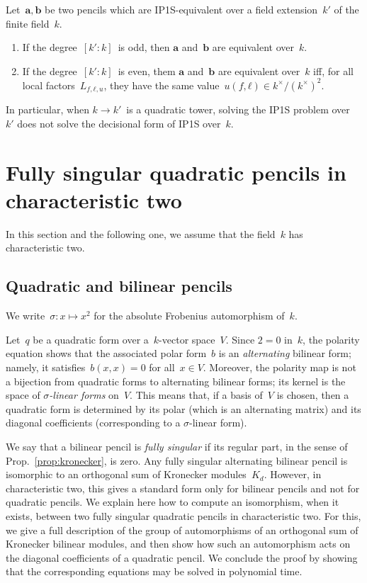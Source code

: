 \documentclass{article}%
\begin{document}
\begin{prop}\label{prop:IP1S-extension}
Let~$\bm{a}, \bm{b}$ be two pencils which are IP1S-equivalent over a
field extension~$k'$ of the finite field~$k$.
\begin{enumerate}
\item If the degree~$[k':k]$~is odd, then $\bm{a}$ and~$\bm{b}$ are
equivalent over~$k$.
\item If the degree~$[k':k]$~is even, them $\bm{a}$ and~$\bm{b}$ are
equivalent over~$k$ iff, for all local factors~$L_{f,ℓ,u}$, they have the
same value~$u(f,ℓ) ∈ k^{×}/(k^{×})^2$.
\end{enumerate}
\end{prop}

In particular, when $k → k'$~is a quadratic tower, solving the IP1S
problem over~$k'$ does not solve the decisional form of IP1S over~$k$.

\section{Fully singular quadratic pencils in characteristic two}%
\label{S:quad-sing}
In this section and the following one, we assume that the field~$k$ has
characteristic two.

\subsection{Quadratic and bilinear pencils}%

We write~$σ: x ↦ x^2$ for the absolute Frobenius automorphism of~$k$.

Let~$q$ be a quadratic form over a~$k$-vector space~$V$. Since $2 = 0$
in~$k$, the polarity equation shows that the associated polar form~$b$ is
an \emph{alternating} bilinear form; namely, it satisfies~$b(x,x) = 0$
for all~$x ∈ V$. Moreover, the polarity map is not a bijection from
quadratic forms to alternating bilinear forms; its kernel is the space of
\emph{$σ$-linear forms} on~$V$. This means that, if a basis of~$V$ is
chosen, then a quadratic form is determined by its polar (which is an
alternating matrix) and its diagonal coefficients (corresponding to a
$σ$-linear form).

\bigbreak

We say that a bilinear pencil is \emph{fully singular} if
its regular part, in the sense of Prop.~\ref{prop:kronecker}, is zero.
Any fully singular alternating bilinear pencil is isomorphic to
an orthogonal sum of Kronecker modules~$K_d$.
However, in characteristic two, this gives a standard form only for
bilinear pencils and not for quadratic pencils. We explain here how to
compute an isomorphism, when it exists, between two fully singular
quadratic pencils in characteristic two. For this, we give a full
description of the group of automorphisms of an orthogonal sum of
Kronecker bilinear modules, and then show how such an automorphism acts
on the diagonal coefficients of a quadratic pencil.
We conclude the proof by showing that the corresponding equations
may be solved in polynomial time.
\end{document}
